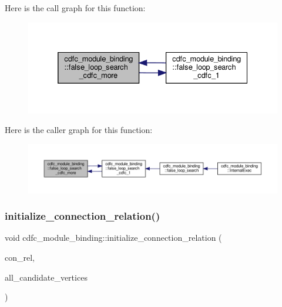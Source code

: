 Here is the call graph for this function\+:
\nopagebreak
\begin{figure}[H]
\begin{center}
\leavevmode
\includegraphics[width=332pt]{d9/dc4/classcdfc__module__binding_a8bc1294bc28ba788416147655ac1d17c_cgraph}
\end{center}
\end{figure}
Here is the caller graph for this function\+:
\nopagebreak
\begin{figure}[H]
\begin{center}
\leavevmode
\includegraphics[width=350pt]{d9/dc4/classcdfc__module__binding_a8bc1294bc28ba788416147655ac1d17c_icgraph}
\end{center}
\end{figure}
\mbox{\label{classcdfc__module__binding_a73c31494075a9cc9bfddb9e83bfd2dca}} 
\subsubsection{\texorpdfstring{initialize\+\_\+connection\+\_\+relation()}{initialize\_connection\_relation()}}
{\footnotesize\ttfamily void cdfc\+\_\+module\+\_\+binding\+::initialize\+\_\+connection\+\_\+relation (\begin{DoxyParamCaption}\item[{\hyperlink{cdfc__module__binding_8hpp_add937cbd74df34342adc0bb9231809a8}{connection\+\_\+relation} \&}]{con\+\_\+rel,  }\item[{\hyperlink{classOpVertexSet}{Op\+Vertex\+Set} \&}]{all\+\_\+candidate\+\_\+vertices }\end{DoxyParamCaption})\hspace{0.3cm}{\ttfamily [protected]}}



